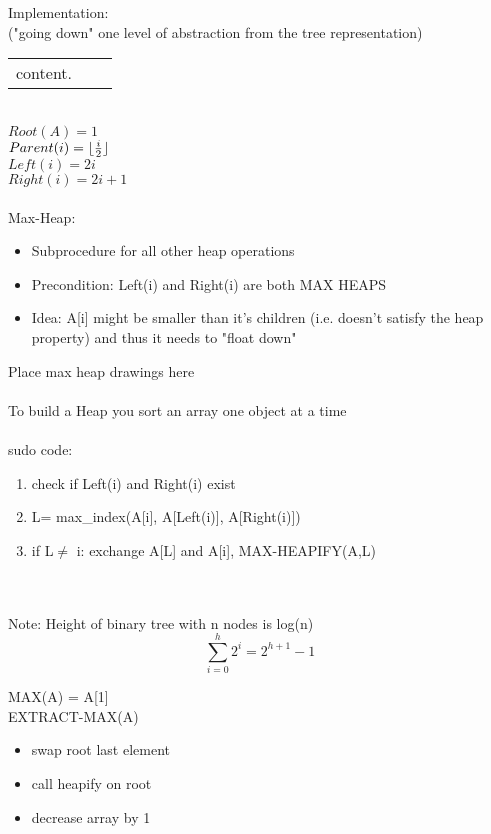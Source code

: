 \documentclass{article}
\DeclarePairedDelimiter\floor{\lfloor}{\rfloor}
\begin{document}
		Implementation:\\
		("going down" one level of abstraction from the tree representation)\\
		\begin{tabular}{r|cl}
			content.
		\end{tabular}
		\\
		$Root(A) = 1$\\
		$Parent(i) = \floor{\frac{i}{2}}$\\
		$Left(i) = 2i$\\
		$Right(i) = 2i + 1$\\
		\\
		Max-Heap:\\
		\begin{itemize}
			\item Subprocedure for all other heap operations
			\item Precondition: Left(i) and Right(i) are both MAX HEAPS
			\item Idea: A[i] might be smaller than it's children (i.e. doesn't satisfy the heap property) and thus it needs to "float down"
		\end{itemize}
		Place max heap drawings here\\\\
		To build a Heap you sort an array one object at a time\\\\
		sudo code:\\
		\begin{enumerate}
			\item check if Left(i) and Right(i) exist
			\item L= max\_index(A[i], A[Left(i)], A[Right(i)])
			\item if L$\neq$ i: exchange A[L] and A[i], MAX-HEAPIFY(A,L)\\\\\\
		\end{enumerate}
		Note: Height of binary tree with n nodes is log(n)\\
		
		$$\sum_{i=0}^{h} 2^i = 2^{h+1} -1$$
		
		MAX(A) = A[1]\\
		EXTRACT-MAX(A)
		\begin{itemize}
			\item swap root last element
			\item call heapify on root
			\item decrease array by 1
		\end{itemize}
		
\end{document}
